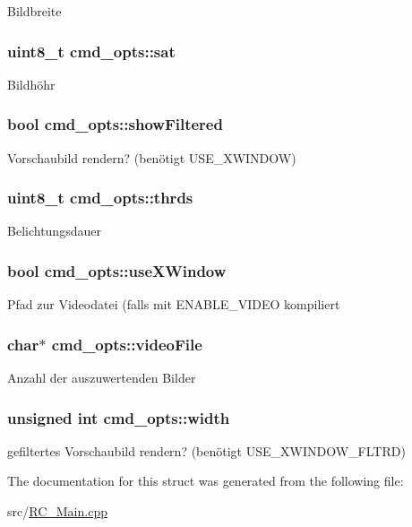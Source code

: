 Bildbreite \hypertarget{structcmd__opts_aa83f2910f6a1803ee8c9f9e3581db314}{
\subsubsection[{sat}]{\setlength{\rightskip}{0pt plus 5cm}uint8\+\_\+t cmd\+\_\+opts\+::sat}}\label{structcmd__opts_aa83f2910f6a1803ee8c9f9e3581db314}
Bildhöhr \hypertarget{structcmd__opts_ab2a0a976837dc40909f765546c60c4c9}{
\subsubsection[{show\+Filtered}]{\setlength{\rightskip}{0pt plus 5cm}bool cmd\+\_\+opts\+::show\+Filtered}}\label{structcmd__opts_ab2a0a976837dc40909f765546c60c4c9}
Vorschaubild rendern? (benötigt U\+S\+E\+\_\+\+X\+W\+I\+N\+D\+O\+W) \hypertarget{structcmd__opts_a7518cdbdbc6ed1b8cc404aa675f383a6}{
\subsubsection[{thrds}]{\setlength{\rightskip}{0pt plus 5cm}uint8\+\_\+t cmd\+\_\+opts\+::thrds}}\label{structcmd__opts_a7518cdbdbc6ed1b8cc404aa675f383a6}
Belichtungsdauer \hypertarget{structcmd__opts_aee44e8161de659e8fff50e09100f9ada}{
\subsubsection[{use\+X\+Window}]{\setlength{\rightskip}{0pt plus 5cm}bool cmd\+\_\+opts\+::use\+X\+Window}}\label{structcmd__opts_aee44e8161de659e8fff50e09100f9ada}
Pfad zur Videodatei (falls mit E\+N\+A\+B\+L\+E\+\_\+\+V\+I\+D\+E\+O kompiliert \hypertarget{structcmd__opts_acee5a1c6793898bbda38d6d7fb5de431}{
\subsubsection[{video\+File}]{\setlength{\rightskip}{0pt plus 5cm}char$\ast$ cmd\+\_\+opts\+::video\+File}}\label{structcmd__opts_acee5a1c6793898bbda38d6d7fb5de431}
Anzahl der auszuwertenden Bilder \hypertarget{structcmd__opts_a0f13b6290e7e33c22a258c11ed23f72f}{
\subsubsection[{width}]{\setlength{\rightskip}{0pt plus 5cm}unsigned int cmd\+\_\+opts\+::width}}\label{structcmd__opts_a0f13b6290e7e33c22a258c11ed23f72f}
gefiltertes Vorschaubild rendern? (benötigt U\+S\+E\+\_\+\+X\+W\+I\+N\+D\+O\+W\+\_\+\+F\+L\+T\+R\+D) 

The documentation for this struct was generated from the following file\+:\begin{DoxyCompactItemize}
\item 
src/\hyperlink{RC__Main_8cpp}{R\+C\+\_\+\+Main.\+cpp}\end{DoxyCompactItemize}
